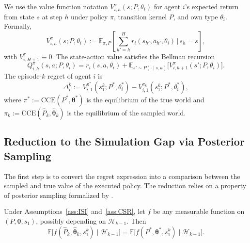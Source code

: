 We use the value function notation $V_{i,h}^\pi(s; P, \theta_i)$ for agent $i$'s expected return from state $s$ at step $h$ under policy $\pi$, transition kernel $P$, and own type $\theta_i$. Formally,
\begin{equation}
V_{i,h}^\pi(s; P, \theta_i) := \mathbb{E}_{\pi, P}\left[\sum_{h'=h}^{H} r_i(s_{h'}, a_{h'}, \theta_i) \,\Big|\, s_h = s\right],
\end{equation}
with $V_{i,H+1}^\pi \equiv 0$. The state-action value satisfies the Bellman recursion
\begin{equation}
Q_{i,h}^\pi(s, a; P, \theta_i) = r_i(s, a, \theta_i) + \mathbb{E}_{s' \sim P(\cdot \mid s, a)}\big[V_{i,h+1}^\pi(s'; P, \theta_i)\big].
\end{equation}
The episode-$k$ regret of agent $i$ is
\begin{equation}
\label{eq:Delta-def}
\Delta_i^k := V_{i,1}^{\pi^*}(s_1^k; P^*, \theta_i^*) - V_{i,1}^{\pi_k}(s_1^k; P^*, \theta_i^*),
\end{equation}
where $\pi^* := \mathrm{CCE}(P^*, \boldsymbol{\theta}^*)$ is the equilibrium of the true world and $\pi_k := \mathrm{CCE}(\hat{P}_k, \hat{\boldsymbol{\theta}}_k)$ is the equilibrium of the sampled world.

\subsection{Reduction to the Simulation Gap via Posterior Sampling}

The first step is to convert the regret expression into a comparison between the sampled and true value of the executed policy. The reduction relies on a property of posterior sampling formalized by \citet{russo2014learning,osband2017posterior}.

\begin{lemma}
\label{lem:ps-equivalence}
Under Assumptions~\ref{ass:ISI} and~\ref{ass:CSR}, let $f$ be any measurable function on $(P, \boldsymbol{\theta}, s_1)$, possibly depending on $\mathcal{H}_{k-1}$. Then
\begin{equation}
\mathbb{E}\big[f(\hat{P}_k, \hat{\boldsymbol{\theta}}_k, s_1^k) \mid \mathcal{H}_{k-1}\big] = \mathbb{E}\big[f(P^*, \boldsymbol{\theta}^*, s_1^k) \mid \mathcal{H}_{k-1}\big].
\end{equation}
\end{lemma}

